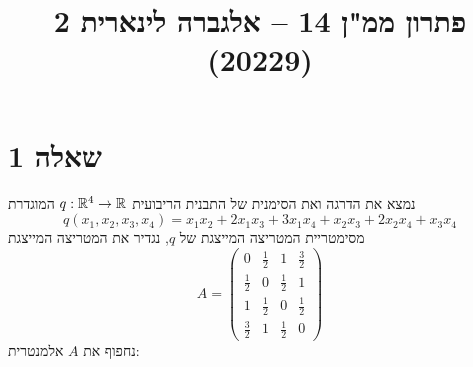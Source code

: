 

\title{פתרון ממ"ן 14 – אלגברה לינארית 2 (20229)}


\maketitle

\section{שאלה 1}
נמצא את הדרגה ואת הסימנית של התבנית הריבועית $q : \mathbb{R}^4 \to \mathbb{R}$ המוגדרת
\[
	q(x_1, x_2, x_3, x_4) = x_1 x_2 + 2x_1 x_3 + 3x_1 x_4 + x_2 x_3 + 2x_2 x_4 + x_3 x_4
\]
מסימטריית המטריצה המייצגת של $q$, נגדיר את המטריצה המייצגת
\[
	A = \begin{pmatrix}
		0 & \frac{1}{2} & 1 & \frac{3}{2} \\
		\frac{1}{2} & 0 & \frac{1}{2} & 1 \\
		1 & \frac{1}{2} & 0 & \frac{1}{2} \\
		\frac{3}{2} & 1 & \frac{1}{2} & 0
	\end{pmatrix}
\]
נחפוף את $A$ אלמנטרית:
